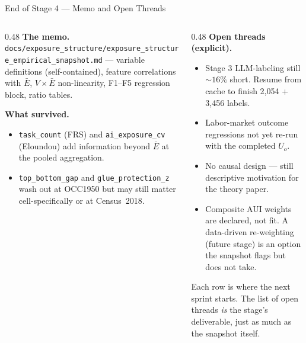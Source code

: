 \documentclass[10pt,english,aspectratio=169]{beamer}
\begin{document}
\begin{frame}{End of Stage 4 --- Memo and Open Threads}
\begin{columns}[T]
\begin{column}{0.48\textwidth}
\textbf{The memo.} \texttt{docs/exposure\_structure/exposure\_structure\_empirical\_snapshot.md} --- variable definitions (self-contained), feature correlations with $\bar E$, $V\times\bar E$ non-linearity, F1--F5 regression block, ratio tables.

\vspace{0.15cm}
\textbf{What survived.}
\begin{itemize}\scriptsize
  \item \texttt{task\_count} (FRS) and \texttt{ai\_exposure\_cv} (Eloundou) add information beyond $\bar E$ at the pooled aggregation.
  \item \texttt{top\_bottom\_gap} and \texttt{glue\_protection\_z} wash out at OCC1950 but may still matter cell-specifically or at Census~2018.
\end{itemize}
\end{column}
\begin{column}{0.48\textwidth}
\textbf{Open threads (explicit).}
\begin{itemize}\scriptsize
  \item Stage 3 LLM-labeling still $\sim 16\%$ short. Resume from cache to finish 2{,}054 + 3{,}456 labels.
  \item Labor-market outcome regressions not yet re-run with the completed $U_o$.
  \item No causal design --- still descriptive motivation for the theory paper.
  \item Composite AUI weights are declared, not fit. A data-driven re-weighting (future stage) is an option the snapshot flags but does not take.
\end{itemize}

\vspace{0.15cm}
\begin{tcolorbox}[colback=blue!3,colframe=RedTitle!60]\scriptsize
Each row is where the next sprint starts. The list of open threads \emph{is} the stage's deliverable, just as much as the snapshot itself.
\end{tcolorbox}
\end{column}
\end{columns}
\end{frame}
\end{document}
